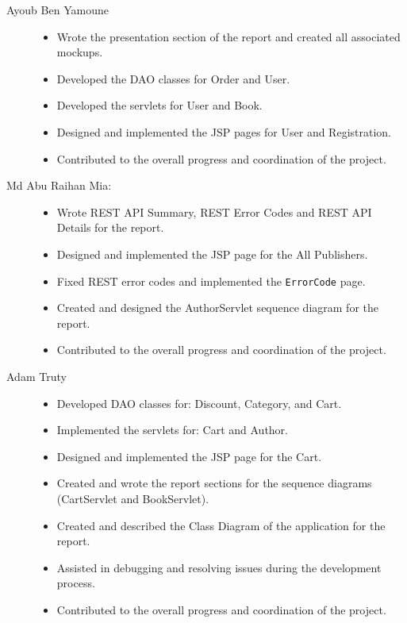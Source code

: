 \begin{description}
	\item[Ayoub Ben Yamoune] 	    
	\begin{itemize}
		\item Wrote the presentation section of the report and created all associated mockups.
		\item Developed the DAO classes for Order and User.
		\item Developed the servlets for User and Book.
		\item Designed and implemented the JSP pages for User and Registration.
		\item Contributed to the overall progress and coordination of the project.
	\end{itemize}
	
	\item[Md Abu Raihan Mia:] \hfill
	\begin{itemize} 
	\item Wrote REST API Summary, REST Error Codes and REST API Details for the report.
	\item Designed and implemented the JSP page for the All Publishers.
	\item Fixed REST error codes and implemented the \texttt{ErrorCode} page.
	\item Created and designed the AuthorServlet sequence diagram for the report.
	\item Contributed to the overall progress and coordination of the project.
	\end{itemize}

	\item[Adam Truty]
	\begin{itemize}
		\item Developed DAO classes for: Discount, Category, and Cart.
		\item Implemented the servlets for: Cart and Author.
		\item Designed and implemented the JSP page for the Cart.
		\item Created and wrote the report sections for the sequence diagrams (CartServlet and BookServlet).
		\item Created and described the Class Diagram of the application for the report.
		\item Assisted in debugging and resolving issues during the development process.
		\item Contributed to the overall progress and coordination of the project.
	\end{itemize}

\end{description}
